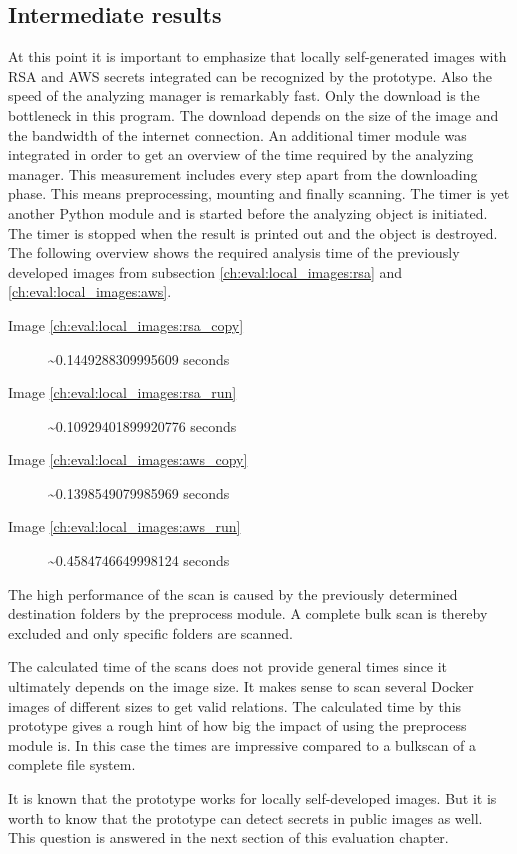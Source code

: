 \subsection{Intermediate results}
At this point it is important to emphasize that locally self-generated images with RSA and AWS secrets integrated can be recognized by the prototype.
Also the speed of the analyzing manager is remarkably fast. 
Only the download is the bottleneck in this program. 
The download depends on the size of the image and the bandwidth of the internet connection.
An additional timer module was integrated in order to get an overview of the time required by the analyzing manager.
This measurement includes every step apart from the downloading phase. This means preprocessing, mounting and finally scanning.
The timer is yet another Python module and is started before the analyzing object is initiated. 
The timer is stopped when the result is printed out and the object is destroyed.
The following overview shows the required analysis time of the previously developed images from subsection \ref{ch:eval:local_images:rsa} and \ref{ch:eval:local_images:aws}. 
\begin{description}
\item [Image \ref{ch:eval:local_images:rsa_copy}] \textasciitilde 0.1449288309995609 seconds
\item [Image \ref{ch:eval:local_images:rsa_run}] \textasciitilde 0.10929401899920776 seconds
\item [Image \ref{ch:eval:local_images:aws_copy}] \textasciitilde 0.1398549079985969 seconds
\item [Image \ref{ch:eval:local_images:aws_run}] \textasciitilde 0.4584746649998124 seconds
\end{description}
The high performance of the scan is caused by the previously determined destination folders by the preprocess module.
A complete bulk scan is thereby excluded and only specific folders are scanned.

The calculated time of the scans does not provide general times since it ultimately depends on the image size. 
It makes sense to scan several Docker images of different sizes to get valid relations.
The calculated time by this prototype gives a rough hint of how big the impact of using the preprocess module is.
In this case the times are impressive compared to a bulkscan of a complete file system.

It is known that the prototype works for locally self-developed images. 
But it is worth to know that the prototype can detect secrets in public images as well.
This question is answered in the next section of this evaluation chapter.